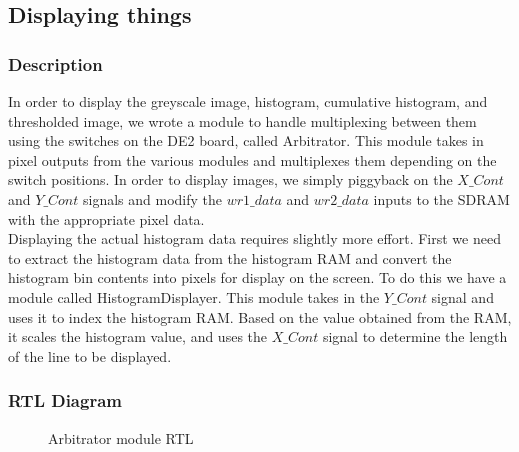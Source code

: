 \documentclass[12pt]{article}
\begin{document}
  
  \subsection{Displaying things}
  \subsubsection{Description}
  In order to display the greyscale image, histogram, cumulative histogram, and thresholded image, we wrote a module to handle multiplexing between them using the switches on the DE2 board, called Arbitrator. This module takes in pixel outputs from the various modules and multiplexes them depending on the switch positions. In order to display images, we simply piggyback on the \(X\_Cont\) and \(Y\_Cont\) signals and modify the \(wr1\_data\) and \(wr2\_data\) inputs to the SDRAM with the appropriate pixel data. \\
      
  Displaying the actual histogram data requires slightly more effort. First we need to extract the histogram data from the histogram RAM and convert the histogram bin contents into pixels for display on the screen. To do this we have a module called HistogramDisplayer. This module takes in the \(Y\_Cont\) signal and uses it to index the histogram RAM. Based on the value obtained from the RAM, it scales the histogram value, and uses the \(X\_Cont\) signal to determine the length of the line to be displayed. 
  \subsubsection{RTL Diagram}
    \begin{figure}[H]
    \caption{Arbitrator module RTL}
    \label{fig:arbitrator_rtl}
  \end{figure} 
\end{document}
